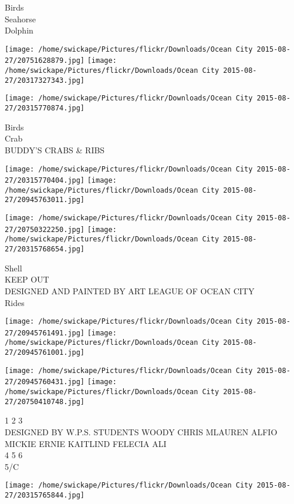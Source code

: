 \documentclass[10pt,letterpaper]{article}
\begin{document}
Birds\\
Seahorse\\
Dolphin\\
\pagebreak

\texttt{[image: /home/swickape/Pictures/flickr/Downloads/Ocean City 2015-08-27/20751628879.jpg]}
\texttt{[image: /home/swickape/Pictures/flickr/Downloads/Ocean City 2015-08-27/20317327343.jpg]}

\vspace{0.25in}
\texttt{[image: /home/swickape/Pictures/flickr/Downloads/Ocean City 2015-08-27/20315770874.jpg]}

Birds\\
Crab\\
BUDDY'S CRABS \& RIBS\\
\pagebreak

\texttt{[image: /home/swickape/Pictures/flickr/Downloads/Ocean City 2015-08-27/20315770404.jpg]}
\texttt{[image: /home/swickape/Pictures/flickr/Downloads/Ocean City 2015-08-27/20945763011.jpg]}

\texttt{[image: /home/swickape/Pictures/flickr/Downloads/Ocean City 2015-08-27/20750322250.jpg]}
\texttt{[image: /home/swickape/Pictures/flickr/Downloads/Ocean City 2015-08-27/20315768654.jpg]}

Shell\\
KEEP OUT\\
DESIGNED AND PAINTED BY ART LEAGUE OF OCEAN CITY\\
Rides\\
\pagebreak

\texttt{[image: /home/swickape/Pictures/flickr/Downloads/Ocean City 2015-08-27/20945761491.jpg]}
\texttt{[image: /home/swickape/Pictures/flickr/Downloads/Ocean City 2015-08-27/20945761001.jpg]}

\texttt{[image: /home/swickape/Pictures/flickr/Downloads/Ocean City 2015-08-27/20945760431.jpg]}
\texttt{[image: /home/swickape/Pictures/flickr/Downloads/Ocean City 2015-08-27/20750410748.jpg]}

1 2 3\\
DESIGNED BY W.P.S. STUDENTS WOODY CHRIS MLAUREN ALFIO MICKIE ERNIE KAITLIND FELECIA ALI\\
4 5 6\\
5/C\\
\pagebreak

\texttt{[image: /home/swickape/Pictures/flickr/Downloads/Ocean City 2015-08-27/20315765844.jpg]}
\end{document}
